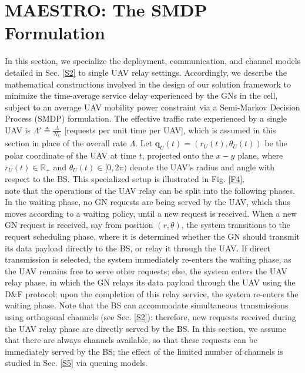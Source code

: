 \documentclass[10pt, twocolumn]{IEEEtran}
\theoremstyle{plain}
\theoremstyle{definition}
\theoremstyle{remark}
\begin{document}
\section{MAESTRO: The SMDP Formulation}\label{S3}

In this section, we specialize the deployment, communication, and channel models detailed in Sec. \ref{S2} to single UAV relay settings. Accordingly, we describe the mathematical constructions involved in the design of our solution framework to minimize the time-average service delay experienced by the GNs in the cell, subject to an average UAV mobility power constraint via a Semi-Markov Decision Process (SMDP) formulation. The effective traffic rate experienced by a single UAV is $\Lambda'{\triangleq}\frac{\Lambda}{N_U}$ [requests per unit time per UAV], which is assumed in this section in place of the overall rate $\Lambda$. Let $\mathbf{q}_{U}(t){=}(r_{U}(t),\theta_{U}(t))$ be the polar coordinate of the UAV at time $t$, projected onto the $x{-}y$ plane, where $r_{U}(t){\in}\mathbb{R}_{+}$ and $\theta_{U}(t){\in}[0,2\pi)$ denote the UAV's radius and angle with respect to the BS. This specialized setup is illustrated in Fig. \ref{F4}.\\
 note that the operations of the UAV relay can be split into the following phases. In the waiting phase, no GN requests are being served by the UAV, which thus moves according to a {waiting policy}, until a new request is received. When a new GN request is received, say from position $(r,\theta)$, the system transitions to the request scheduling phase, where it is determined whether the GN should transmit its data payload directly to the BS, or relay it through the UAV. If direct transmission is selected, the system immediately re-enters the waiting phase, as the UAV remains free to serve other requests; else, the system enters the UAV relay phase, in which the GN relays its data payload through the UAV using the D\&F protocol; upon the completion of this relay service, the system re-enters the waiting phase. Note that the BS can accommodate simultaneous transmissions using orthogonal channels (see Sec. \ref{S2}): therefore, new requests received during the UAV relay phase are directly served by the BS.  In this section, we assume that there are always channels available, so that these requests can be immediately served by the BS; the effect of the limited number of channels is studied in Sec. \ref{S5} via queuing models.\\
\end{document}
